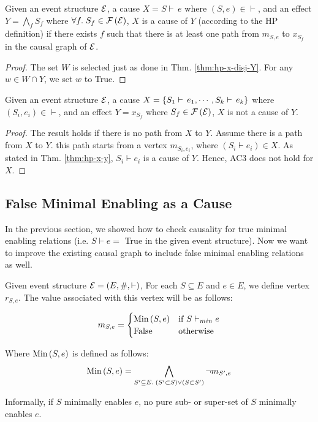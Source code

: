 \begin{thm}\label{thm:hp-x-conj-Y}
Given an event structure $\mathcal{E}$, a cause $X = S \vdash\,e$
where $(S, e) \in \vdash$, and an effect $Y = \bigwedge_{f} S_{f}$
where $\forall f.\;S_f \in \mathcal{F} \left( \mathcal{E} \right)$, $X$ is a cause of $Y$
(according to the HP definition) if there exists $f$ such that
there is at least one path from $m_{S,e}$ to $x_{S_f}$
in the causal graph of $\mathcal{E}$.  
\end{thm}

\begin{proof}
The set $W$ is selected just as done in Thm. \ref{thm:hp-x-disj-Y}.
For any $w \in W \cap Y$, we set $w$ to True.
\end{proof}

\begin{thm}\label{thm:hp-X-Y}
Given an event structure $\mathcal{E}$,
a cause $X = \left\{ S_1 \vdash\, e_1, \cdots, S_k \vdash\, e_k \right\}$
where $(S_i, e_i) \in \vdash$, and an effect $Y = x_{S_f}$
where $S_f \in \mathcal{F} \left( \mathcal{E} \right)$, $X$ is not a cause of $Y$. 
\end{thm}

\begin{proof}
The result holds if there is no path from $X$ to $Y$.
Assume there is a path from $X$ to $Y$.
this path starts from a vertex $m_{S_i,e_i}$, where $(S_i \vdash e_i) \in X$.
As stated in Thm. \ref{thm:hp-x-y}, $S_i \vdash e_i$ is a cause of $Y$.
Hence, AC3 does not hold for $X$.
\end{proof}

\subsection{False Minimal Enabling as a Cause}

In the previous section, we showed how to check causality for
true minimal enabling relations
(i.e. $S \vdash e =$ True in the given event structure).
Now we want to improve the existing causal graph
to include false minimal enabling relations as well.

Given event structure $\mathcal{E} = (E, \#, \vdash)$,
For each $S \subseteq E$ and $e \in E$, we define vertex $r_{S,e}$.
The value associated with this vertex will be as follows:

\[ m_{S,e} =
  \begin{cases}
    \text{Min} \left( S, e \right)   & \text{if } S \vdash_{min} e \\
    \text{False} & \text{otherwise}
  \end{cases}
\]

Where $\text{Min} \left( S, e \right)$ is defined as follows:
\[ \text{Min} \left( S, e \right) =
  \bigwedge_{S' \subseteq E.\;(S' \subset S) \vee (S \subset S')}
  \neg m_{S',e}
\]

Informally, if $S$ minimally enables $e$, no pure sub- or super-set of $S$
minimally enables $e$. 